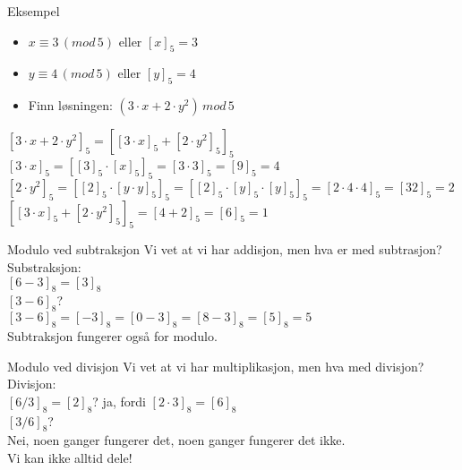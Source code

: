 \begin{frame}{}
\begin{exampleblock}{Eksempel}
\begin{itemize}
\item $x \equiv 3\,(mod\, 5)$ eller $[x]_5=3$
\item $y \equiv 4\,(mod\, 5)$ eller $[y]_5=4$
\item Finn løsningen: $(3\cdot x+2\cdot y^2)\, mod\,5$
\end{itemize}
\end{exampleblock}
\pause
\medskip

$[3\cdot x+2\cdot y^2]_5=[[3\cdot x]_5+[2\cdot y^2]_5]_5$\\

$[3\cdot x]_5=[[3]_5\cdot [x]_5]_5=[3\cdot 3]_5=[9]_5=4$\\
$[2\cdot y^2]_5=[[2]_5\cdot [y\cdot y]_5]_5=[[2]_5\cdot [y]_5\cdot[y]_5]_5=[2\cdot 4\cdot 4]_5=[32]_5=2$\\

$[[3\cdot x]_5+[2\cdot y^2]_5]_5=[4+2]_5=[6]_5=1$
\end{frame}

\begin{frame}[fragile]{Modulo ved subtraksjon}
       Vi vet at vi har addisjon, men hva er med subtrasjon?\\

Substraksjon:\\
$[6-3]_8=[3]_8$\\
$[3-6]_8$?\\
\pause
$[3-6]_8=[-3]_8=[0-3]_8=[8-3]_8=[5]_8=5$\\

Subtraksjon fungerer også for modulo.  
\end{frame}

\begin{frame}{Modulo ved divisjon}
Vi vet at vi har multiplikasjon, men hva med divisjon?\\

Divisjon:\\
$[6/3]_8=[2]_8$? \pause ja, fordi $[2\cdot 3]_8=[6]_8$\\
$[3/6]_8$?\\
\pause
Nei, noen ganger fungerer det, noen ganger fungerer det ikke.\\

Vi kan ikke alltid dele!
\end{frame}